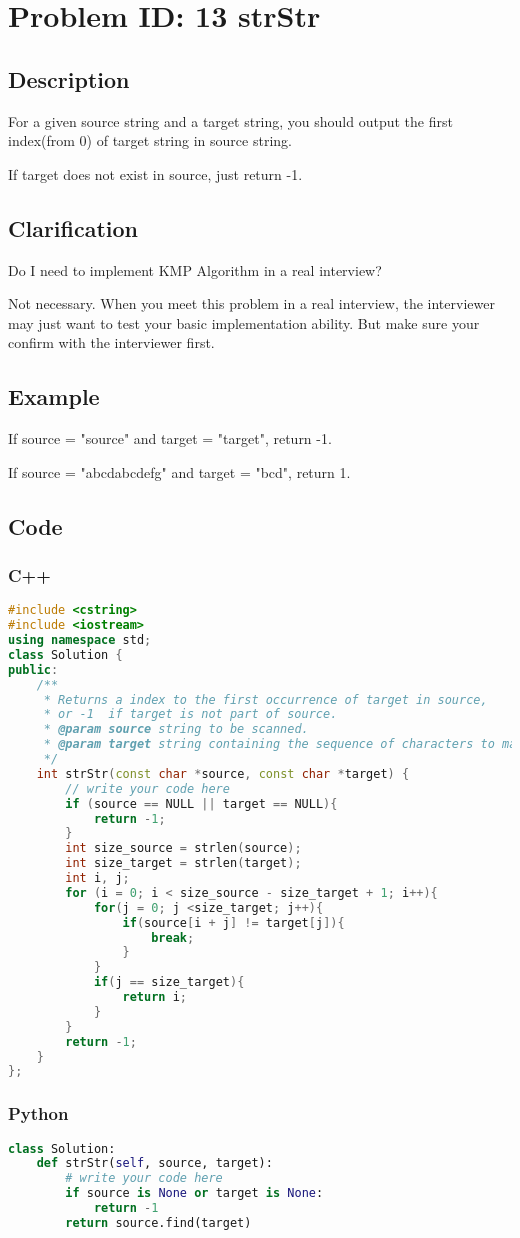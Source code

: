 \section{Problem ID: 13 strStr}
\subsection{Description}
For a given source string and a target string, you should output the first index(from 0) of target string in source string.

If target does not exist in source, just return -1.

\subsection{Clarification}
Do I need to implement KMP Algorithm in a real interview?

Not necessary. When you meet this problem in a real interview, the interviewer may just want to test your basic implementation ability. But make sure your confirm with the interviewer first.

\subsection{Example}
If source = "source" and target = "target", return -1.

If source = "abcdabcdefg" and target = "bcd", return 1.

\subsection{Code}
\scriptsize
\subsubsection{C++}
\begin{lstlisting}[language=C++]
#include <cstring>
#include <iostream>
using namespace std;
class Solution {
public:
    /**
     * Returns a index to the first occurrence of target in source,
     * or -1  if target is not part of source.
     * @param source string to be scanned.
     * @param target string containing the sequence of characters to match.
     */
    int strStr(const char *source, const char *target) {
        // write your code here
        if (source == NULL || target == NULL){
            return -1;
        }
        int size_source = strlen(source);
        int size_target = strlen(target);
        int i, j;
        for (i = 0; i < size_source - size_target + 1; i++){
            for(j = 0; j <size_target; j++){
                if(source[i + j] != target[j]){
                    break;
                }
            }
            if(j == size_target){
                return i;
            }
        }
        return -1;
    }
};
\end{lstlisting}

\subsubsection{Python}
\begin{lstlisting}[language=Python]
class Solution:
    def strStr(self, source, target):
        # write your code here
        if source is None or target is None:
            return -1
        return source.find(target)
\end{lstlisting}
\normalsize 